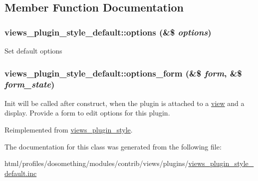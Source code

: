 \subsection{Member Function Documentation}
\hypertarget{classviews__plugin__style__default_adb2765f7fde7c3d8cecaffa3ab660f79}{
\subsubsection[{options}]{\setlength{\rightskip}{0pt plus 5cm}views\_\-plugin\_\-style\_\-default::options (\&\$ {\em options})}}
\label{classviews__plugin__style__default_adb2765f7fde7c3d8cecaffa3ab660f79}
Set default options \hypertarget{classviews__plugin__style__default_a6d6eb45c613c5990a44b3071cb82b36d}{
\subsubsection[{options\_\-form}]{\setlength{\rightskip}{0pt plus 5cm}views\_\-plugin\_\-style\_\-default::options\_\-form (\&\$ {\em form}, \/  \&\$ {\em form\_\-state})}}
\label{classviews__plugin__style__default_a6d6eb45c613c5990a44b3071cb82b36d}
Init will be called after construct, when the plugin is attached to a \hyperlink{classview}{view} and a display. Provide a form to edit options for this plugin. 

Reimplemented from \hyperlink{classviews__plugin__style_afe3d437ff4398315b15c4e60975dbb1c}{views\_\-plugin\_\-style}.

The documentation for this class was generated from the following file:\begin{DoxyCompactItemize}
\item 
html/profiles/dosomething/modules/contrib/views/plugins/\hyperlink{views__plugin__style__default_8inc}{views\_\-plugin\_\-style\_\-default.inc}\end{DoxyCompactItemize}
